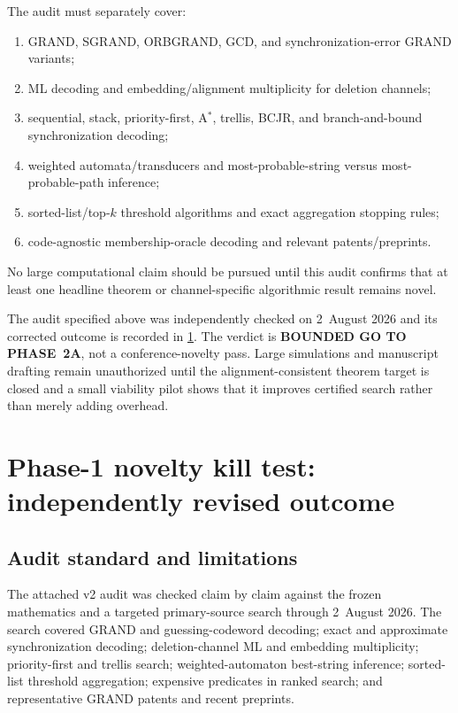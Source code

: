 \documentclass[11pt]{article}
\theoremstyle{definition}
\theoremstyle{remark}
\begin{document}
The audit must separately cover:
\begin{enumerate}
  \item GRAND, SGRAND, ORBGRAND, GCD, and synchronization-error GRAND variants;
  \item ML decoding and embedding/alignment multiplicity for deletion channels;
  \item sequential, stack, priority-first, A$^\ast$, trellis, BCJR, and branch-and-bound synchronization decoding;
  \item weighted automata/transducers and most-probable-string versus most-probable-path inference;
  \item sorted-list/top-$k$ threshold algorithms and exact aggregation stopping rules;
  \item code-agnostic membership-oracle decoding and relevant patents/preprints.
\end{enumerate}

No large computational claim should be pursued until this audit confirms that at least one headline theorem or channel-specific algorithmic result remains novel.

\begin{freezebox}
The audit specified above was independently checked on 2~August 2026 and its corrected outcome is recorded in \cref{sec:phase1}. The verdict is \textbf{BOUNDED GO TO PHASE~2A}, not a conference-novelty pass. Large simulations and manuscript drafting remain unauthorized until the alignment-consistent theorem target is closed and a small viability pilot shows that it improves certified search rather than merely adding overhead.
\end{freezebox}



\section{Phase-1 novelty kill test: independently revised outcome}
\label{sec:phase1}

\subsection{Audit standard and limitations}

The attached v2 audit was checked claim by claim against the frozen mathematics and a targeted primary-source search through 2~August 2026. The search covered GRAND and guessing-codeword decoding; exact and approximate synchronization decoding; deletion-channel ML and embedding multiplicity; priority-first and trellis search; weighted-automaton best-string inference; sorted-list threshold aggregation; expensive predicates in ranked search; and representative GRAND patents and recent preprints.
\end{document}
